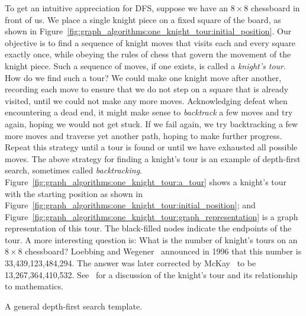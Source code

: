 To get an intuitive appreciation for DFS, suppose we have
an $8 \times 8$ chessboard in front of us. We
place a single knight piece on a fixed
square of the board, as shown in
Figure~\ref{fig:graph_algorithms:one_knight_tour:initial_position}. Our
objective is to find a sequence of knight
moves that visits each and every square exactly once, while obeying
the rules of chess that govern the movement of the knight
piece. Such a sequence of moves, if one
exists, is called a \emph{knight's tour}. How do
we find such a tour? We could make one knight move
after another, recording each move to ensure that we do not step on a
square that is already visited, until we could not make any more
moves. Acknowledging defeat when encountering a dead end, it might
make sense to \emph{backtrack} a few moves and try
again, hoping we would not get stuck. If we fail again, we try
backtracking a few more moves and traverse yet
another path, hoping to make further progress. Repeat this strategy
until a tour is found or until we have exhausted all possible
moves. The above strategy for finding a knight's
tour is an example of depth-first
search, sometimes called
\emph{backtracking}. Figure~\ref{fig:graph_algorithms:one_knight_tour:a_tour}
shows a knight's tour with the starting position as shown in
Figure~\ref{fig:graph_algorithms:one_knight_tour:initial_position};
and
Figure~\ref{fig:graph_algorithms:one_knight_tour:graph_representation}
is a graph representation of this tour. The black-filled nodes
indicate the endpoints of the tour. A more interesting question is:
What is the number of knight's tours on an $8 \times 8$ chessboard?
Loebbing and
Wegener~\cite{LoebbingWegener1996} announced in
1996 that this number is 33,439,123,484,294. The answer was later
corrected by McKay~\cite{McKay1997} to be
13,267,364,410,532. See~\cite{ElkiesStanley2003}
for a discussion of
the knight's tour and its relationship to mathematics.

\begin{algorithm}[!htpb]

\caption{A general depth-first search template.}
\label{alg:graph_algorithms:depth_first_search_template}
\end{algorithm}


